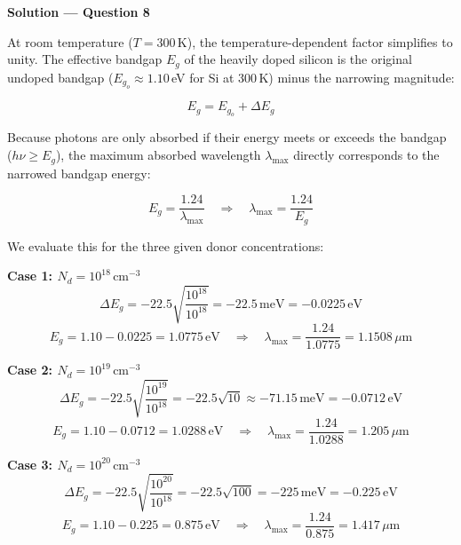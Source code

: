 \textbf{\large Solution --- Question 8}

At room temperature ($T = 300$\,K), the temperature-dependent factor simplifies to unity. The effective bandgap $E_g$ of the heavily doped silicon is the original undoped bandgap ($E_{g_o} \approx 1.10$\,eV for Si at 300\,K) minus the narrowing magnitude:

\begin{equation*}
  E_g = E_{g_o} + \Delta E_g
\end{equation*}

Because photons are only absorbed if their energy meets or exceeds the bandgap ($h\nu \ge E_g$), the maximum absorbed wavelength $\lambda_{\text{max}}$ directly corresponds to the narrowed bandgap energy:

\begin{equation*}
  E_g = \frac{1.24}{\lambda_{\text{max}}} \quad\Longrightarrow\quad \lambda_{\text{max}} = \frac{1.24}{E_g}
\end{equation*}

We evaluate this for the three given donor concentrations:

\textbf{Case 1: $N_d = 10^{18}\,\text{cm}^{-3}$}
\begin{equation*}
  \Delta E_g = -22.5 \sqrt{\frac{10^{18}}{10^{18}}} = -22.5\,\text{meV} = -0.0225\,\text{eV}
\end{equation*}
\begin{equation*}
  E_g = 1.10 - 0.0225 = 1.0775\,\text{eV} \quad\Longrightarrow\quad \boxed{\lambda_{\text{max}} = \frac{1.24}{1.0775} = 1.1508\,\mu\text{m}}
\end{equation*}

\textbf{Case 2: $N_d = 10^{19}\,\text{cm}^{-3}$}
\begin{equation*}
  \Delta E_g = -22.5 \sqrt{\frac{10^{19}}{10^{18}}} = -22.5\sqrt{10} \approx -71.15\,\text{meV} = -0.0712\,\text{eV}
\end{equation*}
\begin{equation*}
  E_g = 1.10 - 0.0712 = 1.0288\,\text{eV} \quad\Longrightarrow\quad \boxed{\lambda_{\text{max}} = \frac{1.24}{1.0288} = 1.205\,\mu\text{m}}
\end{equation*}

\textbf{Case 3: $N_d = 10^{20}\,\text{cm}^{-3}$}
\begin{equation*}
  \Delta E_g = -22.5 \sqrt{\frac{10^{20}}{10^{18}}} = -22.5\sqrt{100} = -225\,\text{meV} = -0.225\,\text{eV}
\end{equation*}
\begin{equation*}
  E_g = 1.10 - 0.225 = 0.875\,\text{eV} \quad\Longrightarrow\quad \boxed{\lambda_{\text{max}} = \frac{1.24}{0.875} = 1.417\,\mu\text{m}}
\end{equation*}

